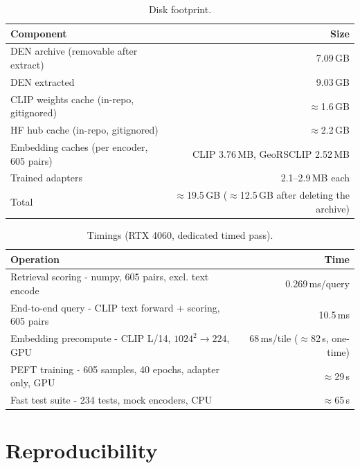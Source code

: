 \documentclass{article}
\begin{document}
\begin{table}[H]
    \centering
    \caption{Disk footprint.}
    \label{tab:disk}
    \begin{tabular}{lr}
        \toprule
        \textbf{Component} & \textbf{Size} \\
        \midrule
        DEN archive (removable after extract)        & 7.09\,GB \\
        DEN extracted                                & 9.03\,GB \\
        CLIP weights cache (in-repo, gitignored)     & $\approx$1.6\,GB \\
        HF hub cache (in-repo, gitignored)           & $\approx$2.2\,GB \\
        Embedding caches (per encoder, 605 pairs)    & CLIP 3.76\,MB, GeoRSCLIP 2.52\,MB \\
        Trained adapters                             & 2.1--2.9\,MB each \\
        Total                               & $\approx$19.5\,GB ($\approx$12.5\,GB after deleting the archive) \\
        \bottomrule
    \end{tabular}
\end{table}

\begin{table}[H]
    \centering
    \caption{Timings (RTX 4060, dedicated timed pass).}
    \label{tab:timings}
    \begin{tabular}{lr}
        \toprule
        \textbf{Operation} & \textbf{Time} \\
        \midrule
        Retrieval scoring - numpy, 605 pairs, excl. text encode & 0.269\,ms/query \\
        End-to-end query - CLIP text forward + scoring, 605 pairs & 10.5\,ms \\
        Embedding precompute - CLIP L/14, $1024^2 \rightarrow 224$, GPU & 68\,ms/tile ($\approx$82\,s, one-time) \\
        PEFT training - 605 samples, 40 epochs, adapter only, GPU & $\approx$29\,s \\
        Fast test suite - 234 tests, mock encoders, CPU & $\approx$65\,s \\
        \bottomrule
    \end{tabular}
\end{table}


\section{Reproducibility}
\label{sec:repro}
\end{document}
